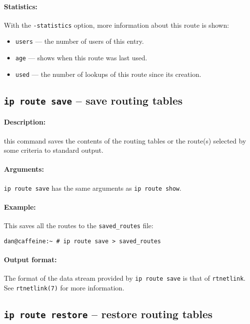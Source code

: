 \paragraph{Statistics:} With the \verb|-statistics| option, more
information about this route is shown:
\begin{itemize}
\item \verb|users| --- the number of users of this entry.
\item \verb|age| --- shows when this route was last used.
\item \verb|used| --- the number of lookups of this route since its creation.
\end{itemize}

\subsection{{\tt ip route save} -- save routing tables}
\label{IP-ROUTE-SAVE}

\paragraph{Description:} this command saves the contents of the routing
tables or the route(s) selected by some criteria to standard output.

\paragraph{Arguments:} \verb|ip route save| has the same arguments as
\verb|ip route show|.

\paragraph{Example:} This saves all the routes to the {\tt saved\_routes}
file:
\begin{verbatim}
dan@caffeine:~ # ip route save > saved_routes
\end{verbatim}

\paragraph{Output format:} The format of the data stream provided by
\verb|ip route save| is that of \verb|rtnetlink|.  See
\verb|rtnetlink(7)| for more information.

\subsection{{\tt ip route restore} -- restore routing tables}
\label{IP-ROUTE-RESTORE}

